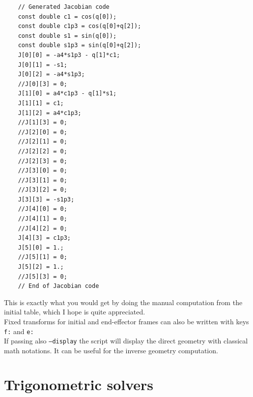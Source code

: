 \documentclass{ecnreport}
\begin{document}
  \begin{minipage}{.1\linewidth}
    \quad\quad
  \end{minipage}
  \begin{minipage}{.45\linewidth}
    \cppstyle \raggedright
    \begin{lstlisting}
    // Generated Jacobian code
    const double c1 = cos(q[0]);
    const double c1p3 = cos(q[0]+q[2]);
    const double s1 = sin(q[0]);
    const double s1p3 = sin(q[0]+q[2]);
    J[0][0] = -a4*s1p3 - q[1]*c1;
    J[0][1] = -s1;
    J[0][2] = -a4*s1p3;
    //J[0][3] = 0;
    J[1][0] = a4*c1p3 - q[1]*s1;
    J[1][1] = c1;
    J[1][2] = a4*c1p3;
    //J[1][3] = 0;
    //J[2][0] = 0;
    //J[2][1] = 0;
    //J[2][2] = 0;
    //J[2][3] = 0;
    //J[3][0] = 0;
    //J[3][1] = 0;
    //J[3][2] = 0;
    J[3][3] = -s1p3;
    //J[4][0] = 0;
    //J[4][1] = 0;
    //J[4][2] = 0;
    J[4][3] = c1p3;
    J[5][0] = 1.;
    //J[5][1] = 0;
    J[5][2] = 1.;
    //J[5][3] = 0;
    // End of Jacobian code
    \end{lstlisting}	
  \end{minipage}
  This is exactly what you would get by doing the manual computation from the initial table, which I hope is quite appreciated.\\
  
  Fixed transforms for initial and end-effector frames can also be written with keys \texttt{f:} and \texttt{e:}\\
  
  If passing also \texttt{--display} the script will display the direct geometry with classical math notations. It can be useful for the inverse geometry computation.
  
  \newpage
  \section{Trigonometric solvers}\label{trigsolve}
  
\end{document}
